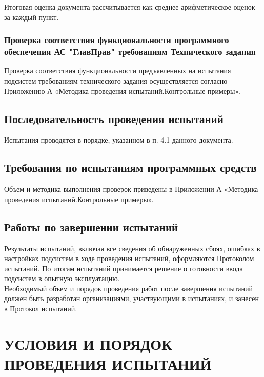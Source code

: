 \documentclass[russian, utf8, 12pt,pointsubsection,floatsubsection]{eskdtext}
\begin{document}
 Итоговая оценка документа рассчитывается как среднее арифметическое оценок за каждый пункт.
 
\subsubsection{Проверка соответствия функциональности программного обеспечения АС "ГлавПрав" требованиям Технического задания}
Проверка соответствия функциональности предъявленных на испытания подсистем требованиям технического задания осуществляется согласно Приложению А «Методика проведения испытаний.Контрольные примеры».


\subsection{Последовательность проведения испытаний}
Испытания проводятся в порядке, указанном в п. 4.1 данного документа.

\subsection{Требования по испытаниям программных средств}
Объем и методика выполнения проверок приведены в Приложении А «Методика проведения испытаний.Контрольные примеры». 

\subsection{Работы по завершении испытаний}
Результаты испытаний, включая все сведения об обнаруженных сбоях, ошибках в настройках подсистем в ходе проведения испытаний, оформляются Протоколом испытаний. По итогам испытаний принимается решение о готовности ввода подсистем в опытную эксплуатацию. \\

Необходимый объем и порядок проведения работ после завершения испытаний должен быть разработан организациями, участвующими в испытаниях, и занесен в Протокол испытаний. 


\section{УСЛОВИЯ И ПОРЯДОК ПРОВЕДЕНИЯ ИСПЫТАНИЙ}

\end{document}
